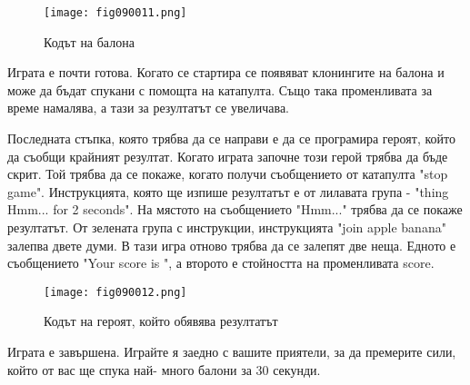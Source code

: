 \begin{figure}[H]
  \centering
  \texttt{[image: fig090011.png]}
  \caption{Кодът на балона}
\label{fig090011}
\end{figure}

Играта е почти готова. Когато се стартира се появяват клонингите на балона и може да бъдат спукани с помощта на катапулта. Също така променливата за време намалява, а тази за резултатът се увеличава.

Последната стъпка, която трябва да се направи е да се програмира героят, който да съобщи крайният резултат. Когато играта започне този герой трябва да бъде скрит. Той трябва да се покаже, когато получи съобщението от катапулта "stop game". Инструкцията, която ще изпише резултатът е от лилавата група - "thing Hmm... for 2 seconds". На мястото на съобщението "Hmm..." трябва да се покаже резултатът. От зелената група с инструкции, инструкцията "join apple banana" залепва двете думи. В тази игра отново трябва да се залепят две неща. Едното е съобщението "Your score is ", а второто е стойността на променливата score.

\begin{figure}[H]
  \centering
  \texttt{[image: fig090012.png]}
  \caption{Кодът на героят, който обявява резултатът}
\label{fig090012}
\end{figure}

Играта е завършена. Играйте я заедно с вашите приятели, за да премерите сили, който от вас ще спука най- много балони за 30 секунди.